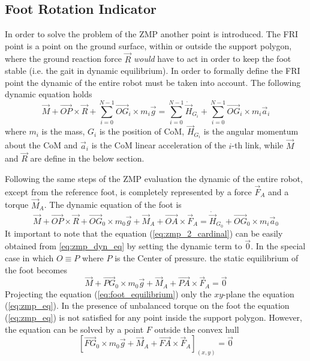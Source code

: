 \subsection{Foot Rotation Indicator}
In order to solve the problem of the ZMP another point is introduced. The FRI point is a point on
the ground surface, within or outside the support polygon, where the ground reaction force $\vec{R}$
\emph{would} have to act in order to keep the foot stable (i.e. the gait in dynamic equilibrium).
In order to formally define the FRI point the dynamic of the entire robot must be taken into
account.
The following dynamic equation holds 
\[
\vec{M} + \vec{OP} \times \vec{R} + \sum_{i=0}^{N-1} {\vec{OG}_i \times m_i \vec{g}} = \sum_{i=0}^{N-1}
\dot{\vec{H}}_{G_i} + \sum_{i=0}^{N-1} {\vec{OG}_i \times m_i \vec{a}_i}
\]
where $m_i$ is the mass, $G_i$ is the position of CoM, $\vec{H}_{G_i}$ is the angular momentum about the CoM and $\vec{a}_i$ is the CoM linear acceleration of the $i$-th link, while $\vec{M}$ and
$\vec{R}$ are define in the below section.
\par
Following the same steps of the ZMP evaluation the dynamic of the entire robot, except from
the reference foot, is completely represented by a force $\vec{F}_A$ and a torque $\vec{M}_A$.
The dynamic equation of the foot is
\begin{equation}
  \label{eq:zmp_dyn_eq}
  \vec{M} + \vec{OP} \times \vec{R} + \vec{OG}_0 \times m_0 \vec{g} + \vec{M}_A + \vec{OA} \times \vec{F}_A  = \dot{\vec{H}}_{G_0} + \vec{OG}_0 \times m_i \vec{a}_0
\end{equation}
It important to note that the equation (\ref{eq:zmp_2_cardinal}) can be easily obtained from
\ref{eq:zmp_dyn_eq} by setting the dynamic term to $\vec{0}$.
In the special case in which $O \equiv P$ where $P$ is the Center of pressure. the static
equilibrium of the foot becomes
\begin{equation}
  \label{eq:foot_equilibrium}
  \vec{M} + \vec{PG}_0 \times m_0 \vec{g} + \vec{M}_A + \vec{PA} \times \vec{F}_A = \vec{0}
\end{equation}
Projecting the equation (\ref{eq:foot_equilibrium}) only the $xy$-plane the equation
(\ref{eq:zmp_eq}). In the presence of unbalanced torque on the foot the equation
(\ref{eq:zmp_eq}) is not satisfied for any point inside the support polygon. However, the equation
can be solved by a point $F$ outside the convex hull
\begin{equation}
  \label{eq:fri_eq}
  \left [\vec{FG}_0 \times m_0 \vec{g} + \vec{M}_A + \vec{FA} \times \vec{F}_A \right]_{(x,y)} = \vec{0}
\end{equation}
